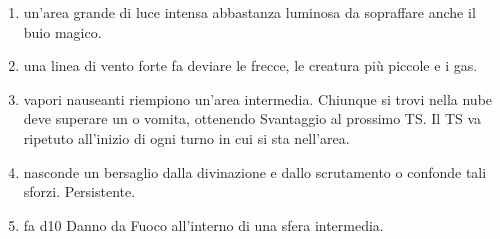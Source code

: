 \documentclass[itdr]{subfiles}
\begin{document}
\begin{enumerate}
	\item {} un'area grande di luce intensa abbastanza luminosa da sopraffare anche il buio magico.
	\item {} una linea di vento forte fa deviare le frecce, le creatura più piccole e i gas.
	\item {} vapori nauseanti riempiono un'area intermedia. Chiunque si trovi nella nube deve superare un  o vomita, ottenendo Svantaggio al prossimo TS. Il TS va ripetuto all'inizio di ogni turno in cui si sta nell'area.
	\item {} nasconde un bersaglio dalla \mbox{divinazione} e dallo scrutamento o confonde tali sforzi. \mbox{Persistente.}
	\item {} fa d10 Danno da Fuoco all'interno di una sfera intermedia.

\vfill
\break


\end{enumerate}
\end{document}
